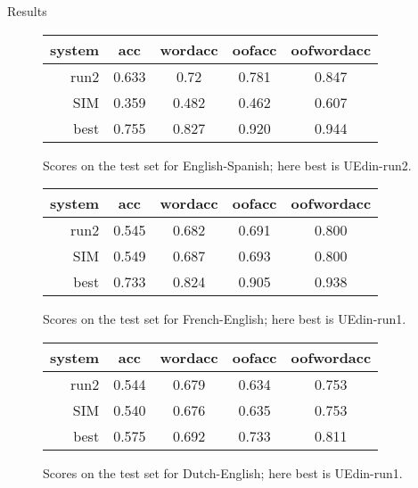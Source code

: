 \documentclass[final,t]{beamer}
\begin{document}
\begin{frame}{}
\begin{columns}
\begin{column}{.64\linewidth}
\begin{block}{Results}
\begin{figure}[t]
  \begin{center}
  \begin{tabular}{|r|c|c|c|c|}
    \hline
    system & acc      & wordacc  & oofacc & oofwordacc \\
    \hline
    run2  &  0.633 & 0.72 & 0.781 & 0.847 \\
    SIM    &  0.359 &  0.482 & 0.462 & 0.607 \\
    best   &  0.755 & 0.827   & 0.920  & 0.944 \\
    \hline
  \end{tabular}
  \end{center}
\caption{Scores on the test set for English-Spanish; here best is UEdin-run2.}
\label{fig:theresults-en-es}
\end{figure}

\begin{figure}[t]
  \begin{center}
  \begin{tabular}{|r|c|c|c|c|}
    \hline
    system & acc      & wordacc  & oofacc & oofwordacc \\
    \hline
    run2  & 0.545  & 0.682 & 0.691 & 0.800 \\
    SIM        &  0.549 & 0.687 & 0.693 & 0.800 \\
    best & 0.733 & 0.824 & 0.905 & 0.938 \\
    \hline
  \end{tabular}
  \end{center}
\caption{Scores on the test set for French-English; here best is UEdin-run1.}
\label{fig:theresults-fr-en}
\end{figure}

\begin{figure}[t]
  \begin{center}
  \begin{tabular}{|r|c|c|c|c|}
    \hline
    system & acc      & wordacc  & oofacc & oofwordacc \\
    \hline
    run2        &  0.544      &  0.679  & 0.634   & 0.753    \\
    SIM              &  0.540      &  0.676  & 0.635   & 0.753    \\
    best       &  0.575   & 0.692  & 0.733      &  0.811 \\
    \hline
  \end{tabular}
  \end{center}
\caption{Scores on the test set for Dutch-English; here best is UEdin-run1.}
\label{fig:theresults-nl-en}
\end{figure}


\end{block}
\end{column}
\end{columns}
\end{frame}
\end{document}
